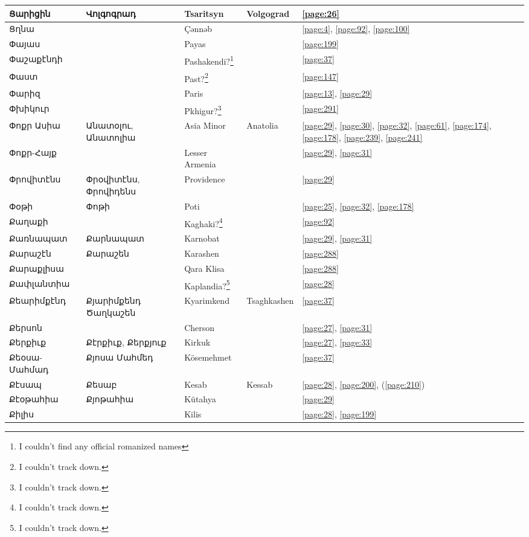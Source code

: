 \begin{center}
\begin{longtable}{|p{}|p{3cm}|p{3cm}|p{2cm}|p{3cm}|}
	Ցարիցին&Վոլգոգրադ & Tsaritsyn&Volgograd &\ref{page:26}\\ \hline
	Ցղնա& &Çənnəb   & &\ref{page:4}, \ref{page:92}, \ref{page:100}\\ \hline
	Փայաս& & Payas& &\ref{page:199}\\ \hline
	Փաշաքէնդի& &Pashakendi?\footnote{I couldn't find any official romanized names} & &\ref{page:37}\\ \hline
	Փաստ& & Past?\footnote{I couldn't track down.}& &\ref{page:147}\\ \hline
	Փարիզ& & Paris& &\ref{page:13}, \ref{page:29}\\ \hline
	Փխիկուր& &Pkhigur?\footnote{I couldn't track down.} & &\ref{page:291}\\ \hline
	Փոքր Ասիա &Անատօլու, Անատոլիա &
	Asia Minor&Anatolia &\ref{page:29}, \ref{page:30}, \ref{page:32}, \ref{page:61}, \ref{page:174}, \ref{page:178}, \ref{page:239}, \ref{page:241}\\ \hline
	Փոքր-Հայք& &Lesser Armenia & &\ref{page:29}, \ref{page:31}\\ \hline
	Փրովիտէնս& Փրօվիտէնս, Փրովիդենս& Providence& &\ref{page:29}\\ \hline
	Փօթի& Փոթի& Poti& &\ref{page:25}, \ref{page:32}, \ref{page:178}\\ \hline
	Քաղաքի& &Kaghaki?\footnote{I couldn't track down.} & &\ref{page:92}\\ \hline
	Քառնապատ&Քարնապատ &Karnobat & &\ref{page:29}, \ref{page:31}\\ \hline
	Քարաշէն& Քարաշեն&Karashen   & &\ref{page:288}\\ \hline
	Քարաքլիսա& &Qara Klisa & &\ref{page:288}\\ \hline
	Քափլանտիա& &Kaplandia?\footnote{I couldn't track down.} & &\ref{page:28}\\ \hline
	Քեարիմքէնդ&Քյարիմքենդ  Ծաղկաշեն& Kyarimkend&Tsaghkashen &\ref{page:37}\\ \hline
	Քերսոն& &Cherson & &\ref{page:27}, \ref{page:31}\\ \hline
	Քերքիւք&Քէրքիւք, Քերքյուք &Kirkuk & &\ref{page:27}, \ref{page:33}\\ \hline
	Քեօսա-Մահմադ& Քյոսա Մահմեդ&Kösemehmet & &\ref{page:37}\\ \hline
	Քէսապ&Քեսաբ &Kesab &Kessab &\ref{page:28}, \ref{page:200}, (\ref{page:210})\\ \hline
	Քէօթահիա&   Քյոթահիա &Kütahya & &\ref{page:29}\\ \hline
	Քիլիս& &Kilis & &\ref{page:28}, \ref{page:199}\\ \hline

\end{longtable}
\end{center}
